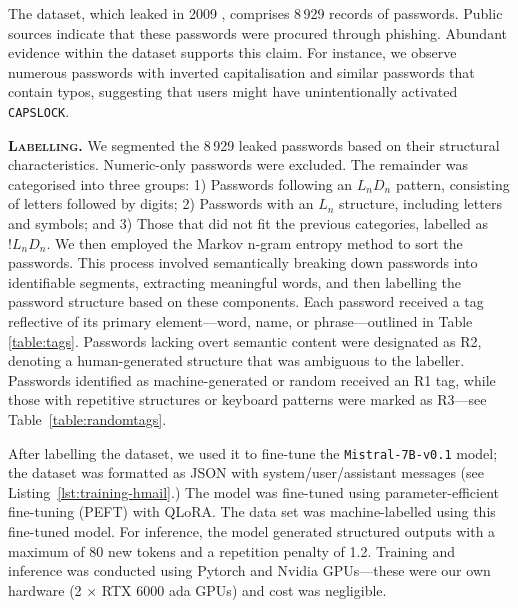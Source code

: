The \hmail dataset, which leaked in 2009 \cite{johnson_hotmail_2009}, comprises 8\,929 records of passwords. Public sources indicate that these passwords were procured through phishing. Abundant evidence within the dataset supports this claim. For instance, we observe numerous passwords with inverted capitalisation and similar passwords that contain typos, suggesting that users might have unintentionally activated \texttt{CAPS\;LOCK}.



\textbf{\textsc{Labelling.}}\: We segmented the 8\,929 leaked passwords based on their structural characteristics. Numeric-only passwords were excluded. The remainder was categorised into three groups: 1) Passwords following an $L_nD_n$ pattern, consisting of letters followed by digits; 2) Passwords with an $L_n$ structure, including letters and symbols; and 3) Those that did not fit the previous categories, labelled as $!L_nD_n$. We then employed the Markov n-gram entropy method to sort the passwords. This process involved semantically breaking down passwords into identifiable segments, extracting meaningful words, and then labelling the password structure based on these components. Each password received a tag reflective of its primary element—word, name, or phrase—outlined in Table \ref{table:tags}. Passwords lacking overt semantic content were designated as R2, denoting a human-generated structure that was ambiguous to the labeller. Passwords identified as machine-generated or random received an R1 tag, while those with repetitive structures or keyboard patterns were marked as R3---see Table~\ref{table:randomtags}.

After labelling the \hmail dataset, we used it to fine-tune the \texttt{Mistral-7B-v0.1} model; the dataset was formatted as JSON with system/user/assistant messages (see Listing~\ref{lst:training-hmail}.) The model was fine-tuned using parameter-efficient fine-tuning (PEFT) with QLoRA. The data set \lizardsquad was machine-labelled using this fine-tuned model. For inference, the model generated structured outputs with a maximum of 80 new tokens and a repetition penalty of 1.2. Training and inference was conducted using Pytorch and Nvidia GPUs---these were our own hardware (2 $\times$ RTX 6000 ada GPUs) and cost was negligible.





